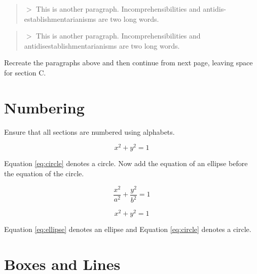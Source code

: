 \documentclass[12pt,a4paper]{article}
\begin{document}
	\begin{quote}
		$>$ This is another paragraph. Incomprehensibilities
		and antidis-establishmentarianisms are two long words.
	\end{quote}
	
	\begin{quote}
		$>$ This is another paragraph.
		Incomprehensibilities and antidisestablishmentarianisms
		are two long words.
	\end{quote}
	
	Recreate the paragraphs above and then continue from
	next page, leaving space for section C.
	
	
	
	\newpage
	
	
	\section{Numbering}
	
	Ensure that all sections are numbered using alphabets.
	
	\[
	x^2+y^2=1
	\tag{1}
	\]
	
	Equation \ref{eq:circle} denotes a circle. Now add the
	equation of an ellipse before the equation of the circle.
	
	\begin{equation}
		\frac{x^2}{a^2}+\frac{y^2}{b^2}=1
		\label{eq:ellipse}
	\end{equation}
	
	\begin{equation}
		x^2+y^2=1
		\label{eq:circle}
	\end{equation}
	
	Equation \ref{eq:ellipse} denotes an ellipse and
	Equation \ref{eq:circle} denotes a circle.
	
	
	
	\section{Boxes and Lines}
	
	
	\usebox{\messagebox}
	
	\usebox{\messagebox}
	
	\usebox{\messagebox}
	
	\vspace{0.5cm}
	
\end{document}
